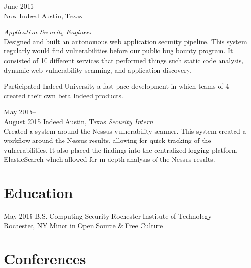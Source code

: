 \documentclass[]{CalebCoffie-CV-Class} %
\begin{document}
\begin{entrylist}
\entry
{June 2016--\\Now}
{Indeed}
{Austin, Texas}
{\emph{Application Security Engineer} \\
Designed and built an autonomous web application security pipeline. This system regularly would find vulnerabilities before our public bug bounty program. It consisted of 10 different services that performed things such static code analysis, dynamic web vulnerability scanning, and application discovery.

Participated Indeed University a fast pace development in which teams
of 4 created their own beta Indeed products.}
\entry
{May 2015--\\August 2015}
{Indeed}
{Austin, Texas}
{\emph{Security Intern} \\
Created a system around the Nessus vulnerability scanner. This system created a workflow around the Nessus results, allowing for quick tracking of the vulnerabilities. It also placed the findings into the centralized logging platform ElasticSearch which allowed for in depth analysis of the Nessus results.}
\end{entrylist}


\section{Education}

\begin{entrylist}
\entry
{May 2016}
{B.S. {\normalfont Computing Security}}
{Rochester Institute of Technology - Rochester, NY}
{Minor in Open Source \& Free Culture}
\end{entrylist}

\section{Conferences}
\end{document}
